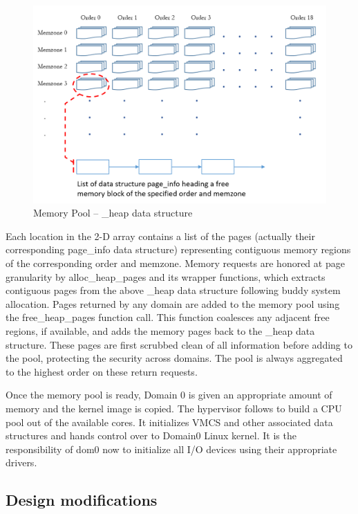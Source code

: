 \begin{figure}[H]
\centering
\includegraphics[scale=0.88]{figures/heap_data_structure.png}
\caption{Memory Pool -- \_heap data structure}
\label{fig:heap_struct}
\end{figure}

Each location in the 2-D array contains a list of the pages (actually their corresponding page\_info data structure) representing contiguous memory regions of the corresponding order and memzone. Memory requests are honored at page granularity by alloc\_heap\_pages and its wrapper functions, which extracts contiguous pages from the above \_heap data structure following buddy system allocation. Pages returned by any domain are added to the memory pool using the free\_heap\_pages function call. This function coalesces any adjacent free regions, if available, and adds the memory pages back to the \_heap data structure. These pages are first scrubbed clean of all information before adding to the pool, protecting the security across domains. The pool is always aggregated to the highest order on these return requests.

Once the memory pool is ready, Domain 0 is given an appropriate amount of memory and the kernel image is copied. The hypervisor follows to build a CPU pool out of the available cores. It initializes VMCS and other associated data structures and hands control over to Domain0 Linux kernel. It is the responsibility of dom0 now to initialize all I/O devices using their appropriate drivers. 

\subsection{Design modifications}

